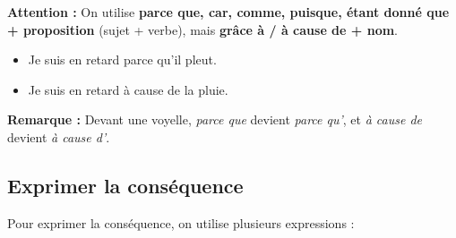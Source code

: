 \documentclass[math,code]{amznotes}
\theoremstyle{remark}
\begin{document}
\begin{notebox}
\textbf{Attention :} On utilise \textbf{parce que, car, comme, puisque, étant donné que + proposition} (sujet + verbe), mais \textbf{grâce à / à cause de + nom}.

\begin{itemize}
    \item Je suis en retard parce qu'il pleut.
    \item Je suis en retard à cause de la pluie.
\end{itemize}

\textbf{Remarque :} Devant une voyelle, \textit{parce que} devient \textit{parce qu'}, et \textit{à cause de} devient \textit{à cause d'}.
\end{notebox}

\subsection*{Exprimer la conséquence}

Pour exprimer la conséquence, on utilise plusieurs expressions :
\end{document}
